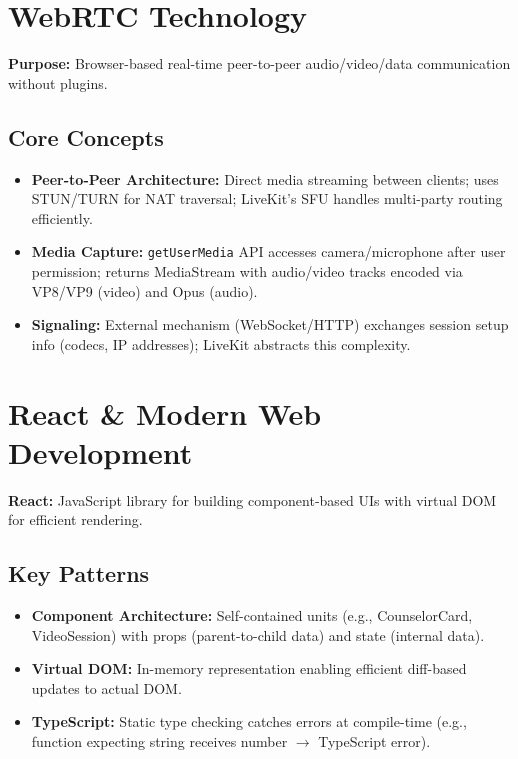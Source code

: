 \documentclass[11pt,a4paper]{report}
\begin{document}
\section{WebRTC Technology}

\textbf{Purpose:} Browser-based real-time peer-to-peer audio/video/data communication without plugins.

\subsection{Core Concepts}
\begin{itemize}
    \item \textbf{Peer-to-Peer Architecture:} Direct media streaming between clients; uses STUN/TURN for NAT traversal; LiveKit's SFU handles multi-party routing efficiently.
    \item \textbf{Media Capture:} \texttt{getUserMedia} API accesses camera/microphone after user permission; returns MediaStream with audio/video tracks encoded via VP8/VP9 (video) and Opus (audio).
    \item \textbf{Signaling:} External mechanism (WebSocket/HTTP) exchanges session setup info (codecs, IP addresses); LiveKit abstracts this complexity.
\end{itemize}

\section{React \& Modern Web Development}

\textbf{React:} JavaScript library for building component-based UIs with virtual DOM for efficient rendering.

\subsection{Key Patterns}
\begin{itemize}
    \item \textbf{Component Architecture:} Self-contained units (e.g., CounselorCard, VideoSession) with props (parent-to-child data) and state (internal data).
    \item \textbf{Virtual DOM:} In-memory representation enabling efficient diff-based updates to actual DOM.
    \item \textbf{TypeScript:} Static type checking catches errors at compile-time (e.g., function expecting string receives number $\rightarrow$ TypeScript error).
\end{itemize}
\end{document}
